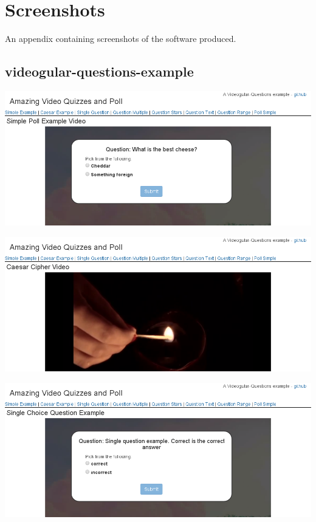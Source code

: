 \chapter{Screenshots} \label{App:Screenshots}

\begin{preamble}
	An appendix containing screenshots of the software produced.
\end{preamble}

\section{videogular-questions-example}

\includegraphics[width=\textwidth]{screenshots/videogular-questions-example-poll-simple.png}

\includegraphics[width=\textwidth]{screenshots/videogular-questions-example-caesar-example.png}

\includegraphics[width=\textwidth]{screenshots/videogular-questions-example-question-single.png}

